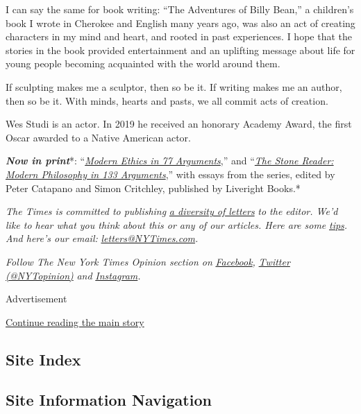 I can say the same for book writing: ``The Adventures of Billy Bean,'' a
children's book I wrote in Cherokee and English many years ago, was also
an act of creating characters in my mind and heart, and rooted in past
experiences. I hope that the stories in the book provided entertainment
and an uplifting message about life for young people becoming acquainted
with the world around them.

If sculpting makes me a sculptor, then so be it. If writing makes me an
author, then so be it. With minds, hearts and pasts, we all commit acts
of creation.

Wes Studi is an actor. In 2019 he received an honorary Academy Award,
the first Oscar awarded to a Native American actor.

\emph{\textbf{Now in print}}*:
``\emph{\href{http://bitly.com/1MW2kN3}{\emph{Modern Ethics in 77
Arguments}}},'' and ``\emph{\href{http://bitly.com/1MW2kN3}{\emph{The
Stone Reader: Modern Philosophy in 133 Arguments}}},'' with essays from
the series, edited by Peter Catapano and Simon Critchley, published by
Liveright Books.*

\emph{The Times is committed to publishing}
\href{https://www.nytimes3xbfgragh.onion/2019/01/31/opinion/letters/letters-to-editor-new-york-times-women.html}{\emph{a
diversity of letters}} \emph{to the editor. We'd like to hear what you
think about this or any of our articles. Here are some}
\href{https://help.nytimes3xbfgragh.onion/hc/en-us/articles/115014925288-How-to-submit-a-letter-to-the-editor}{\emph{tips}}\emph{.
And here's our email:}
\href{mailto:letters@NYTimes.com}{\emph{letters@NYTimes.com}}\emph{.}

\emph{Follow The New York Times Opinion section on}
\href{https://www.facebookcorewwwi.onion/nytopinion}{\emph{Facebook}}\emph{,}
\href{http://twitter.com/NYTOpinion}{\emph{Twitter (@NYTopinion)}}
\emph{and}
\href{https://www.instagram.com/nytopinion/}{\emph{Instagram}}\emph{.}

Advertisement

\protect\hyperlink{after-bottom}{Continue reading the main story}

\hypertarget{site-index}{%
\subsection{Site Index}\label{site-index}}

\hypertarget{site-information-navigation}{%
\subsection{Site Information
Navigation}\label{site-information-navigation}}

